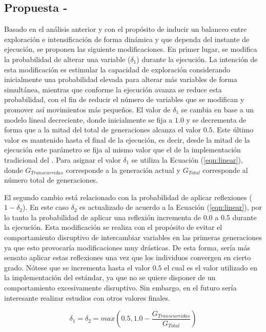 \subsection{Propuesta - \DSBX{}}

Basado en el análisis anterior y con el propósito de inducir un balanceo entre exploración e intensificación de forma dinámica y que dependa del instante de ejecución, 
se proponen las siguiente modificaciones.
%
En primer lugar, se modifica la probabilidad de alterar una variable ($\delta_1$) durante la ejecución.
%
La intención de esta modificación es estimular la capacidad de exploración considerando inicialmente una probabilidad elevada 
para alterar más variables de forma simultánea, mientras que conforme la ejecución avanza se reduce esta probabilidad, con el fin de reducir
el número de variables que se modifican y promover así movimientos más pequeños.
%
El valor de $\delta_1$ se cambia en base a un modelo lineal decreciente, donde inicialmente se fija a $1.0$ y se decrementa de forma
que a la mitad del total de generaciones alcanza el valor $0.5$.
%
Este último valor es mantenido hasta el final de la ejecución, es decir, desde la mitad de la ejecución este parámetro se fija 
al mismo valor que el de la implementación tradicional del \SBX{}.
%
Para asignar el valor $\delta_1$ se utiliza la Ecuación (\ref{eqn:linear}), donde $G_{Transcurridas}$ corresponde a la generación actual 
y $G_{Total}$ corresponde al número total de generaciones.

El segundo cambio está relacionado con la probabilidad de aplicar reflexiones ($1 - \delta_2$).
%
En este caso $\delta_2$ es actualizado de acuerdo a la Ecuación (\ref{eqn:linear}), por lo tanto la probabilidad de aplicar una reflexión 
incrementa de $0.0$ a $0.5$ durante la ejecución.
%
Esta modificación se realiza con el propósito de evitar el comportamiento disruptivo de intercambiar variables en las primeras generaciones 
ya que esto provocaría modificaciones muy drásticas.
%
De esta forma, sería más sensato aplicar estas reflexiones una vez que los individuos convergen en cierto grado.
%
Nótese que se incrementa hasta el valor $0.5$ el cual es el valor utilizado en la implementación del \SBX{} estándar, ya que no se quiere
disponer de un comportamiento excesivamente disruptivo.
%
Sin embargo, en el futuro sería interesante realizar estudios con otros valores finales.

\begin{equation}\label{eqn:linear}
	\delta_1 = \delta_2 = max \left (0.5, 1.0 - \frac{G_{Transcurridas}}{G_{Total}} \right )
\end{equation}


